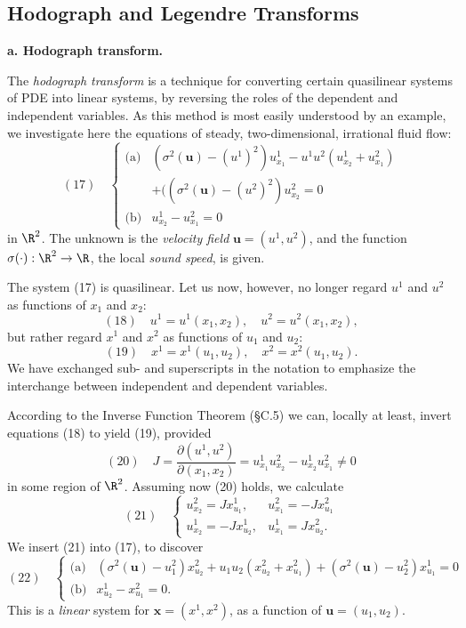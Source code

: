 \subsection{Hodograph and Legendre Transforms}
\label{sec:hodograph-legendre-transforms}

\textbf{a. Hodograph transform.}

\begin{example}
\label{ex:hodograph-transform-irrotational-flow}
The \textit{hodograph transform} is a technique for converting certain quasilinear systems of PDE into linear systems, by reversing the roles of the dependent and independent variables. As this method is most easily understood by an example, we investigate here the equations of steady, two-dimensional, irrational fluid flow:
$$(17) \quad \begin{cases} \text{(a)} & (\sigma^2(\mathbf{u}) - (u^1)^2)u^1_{x_1} - u^1 u^2(u^1_{x_2} + u^2_{x_1}) \\ & +((\sigma^2(\mathbf{u}) - (u^2)^2)u^2_{x_2} = 0 \\ \text{(b)} & u^1_{x_2} - u^2_{x_1} = 0 \end{cases}$$
in $\R^2$. The unknown is the \textit{velocity field} $\mathbf{u} = (u^1, u^2)$, and the function $\sigma(\cdot) : \R^2 \to \R$, the local \textit{sound speed}, is given.

The system (17) is quasilinear. Let us now, however, no longer regard $u^1$ and $u^2$ as functions of $x_1$ and $x_2$:
$$(18) \quad u^1 = u^1(x_1, x_2), \quad u^2 = u^2(x_1, x_2),$$
but rather regard $x^1$ and $x^2$ as functions of $u_1$ and $u_2$:
$$(19) \quad x^1 = x^1(u_1, u_2), \quad x^2 = x^2(u_1, u_2).$$
We have exchanged sub- and superscripts in the notation to emphasize the interchange between independent and dependent variables.

According to the Inverse Function Theorem (\S C.5) we can, locally at least, invert equations (18) to yield (19), provided
$$(20) \quad J = \frac{\partial(u^1, u^2)}{\partial(x_1, x_2)} = u^1_{x_1} u^2_{x_2} - u^1_{x_2} u^2_{x_1} \neq 0$$
in some region of $\R^2$. Assuming now (20) holds, we calculate
$$(21) \quad \begin{cases} u^2_{x_2} = Jx^1_{u_1}, & u^2_{x_1} = -Jx^2_{u_1} \\ u^1_{x_2} = -Jx^1_{u_2}, & u^1_{x_1} = Jx^2_{u_2}. \end{cases}$$
We insert (21) into (17), to discover
$$(22) \quad \begin{cases} \text{(a)} & (\sigma^2(\mathbf{u}) - u^2_1)x^2_{u_2} + u_1 u_2(x^2_{u_2} + x^2_{u_1}) + (\sigma^2(\mathbf{u}) - u^2_2)x^1_{u_1} = 0 \\ \text{(b)} & x^1_{u_2} - x^2_{u_1} = 0. \end{cases}$$
This is a \textit{linear} system for $\mathbf{x} = (x^1, x^2)$, as a function of $\mathbf{u} = (u_1, u_2)$.
\end{example}

